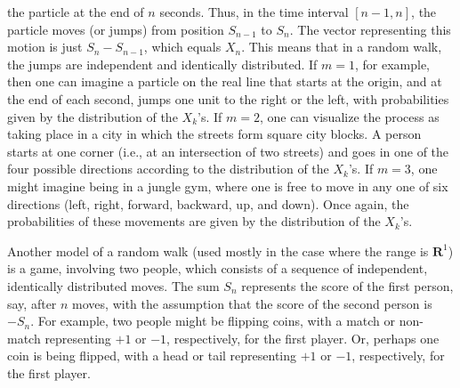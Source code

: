 the particle at the end of $n$ seconds.  Thus, in the time interval $[n-1, n]$, the particle
moves (or jumps) from position $S_{n-1}$ to $S_{n}$.  The vector representing this motion is just
$S_n - S_{n-1}$, which equals $X_n$.  This means that in a random walk, the jumps are
independent and identically distributed.  If $m = 1$, for example, then one can imagine a 
particle on the real line that starts at the origin, and at the end of each second, jumps one
unit to the right or the left, with probabilities given by the distribution of the $X_k$'s.  If
$m = 2$, one can visualize the process as taking place in a city in which the streets form square
city blocks.  A person starts at one corner (i.e., at an intersection of two streets) and goes in
one of the four possible directions according to the distribution of the $X_k$'s.  If $m = 3$,
one might imagine being in a jungle gym, where one is free to move in any one of six directions
(left, right, forward, backward, up, and down).  Once again, the probabilities of these movements
are given by the distribution of the $X_k$'s.
\par
Another model of a random walk (used mostly in the case where the range is ${\mathbf R}^1$) is a
game, involving two people, which consists of a sequence of independent,
identically distributed moves.  The sum $S_n$ represents the score of the first person, say,
after $n$ moves, with the assumption that the score of the second person is $-S_n$.  For
example, two people might be flipping coins, with a match or non-match representing $+1$ or $-1$,
respectively, for the first player.  Or, perhaps one coin is being flipped, with a head or tail
representing $+1$ or $-1$, respectively, for the first player.
